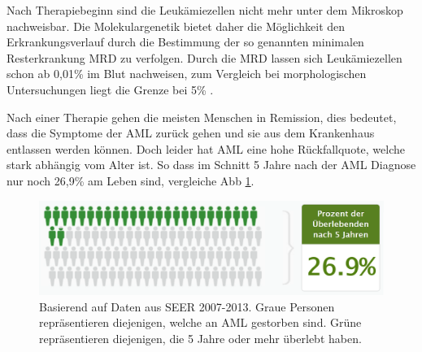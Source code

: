 Nach Therapiebeginn sind die Leukämiezellen nicht mehr unter dem Mikroskop nachweisbar. Die Molekulargenetik bietet daher die Möglichkeit den Erkrankungsverlauf durch die Bestimmung der so genannten minimalen Resterkrankung \ac{MRD} zu verfolgen. Durch die \ac{MRD} lassen sich Leukämiezellen schon ab 0,01\% im Blut nachweisen, zum Vergleich bei morphologischen Untersuchungen liegt die Grenze bei 5\% \cite{Ossenkoppele.2016}.

Nach einer Therapie gehen die meisten Menschen in Remission, dies bedeutet, dass die Symptome der \ac{AML} zurück gehen und sie aus dem Krankenhaus entlassen werden können. Doch leider hat \ac{AML} eine hohe Rückfallquote, welche stark abhängig vom Alter ist. So dass im Schnitt 5 Jahre nach der \ac{AML} Diagnose nur noch 26,9\% am Leben sind, vergleiche \ac{Abb} \ref{fig:seer_aml_rate}.

\begin{figure}
    \centering
    \includegraphics[width=.95\textwidth]{images/SEER_survival_rate_AML.png}
    \caption{Basierend auf Daten aus SEER 2007-2013. Graue Personen repräsentieren diejenigen, welche an \ac{AML} gestorben sind. Grüne repräsentieren diejenigen, die 5 Jahre oder mehr überlebt haben\protect\footnotemark{}.}
    \label{fig:seer_aml_rate}
\end{figure}



